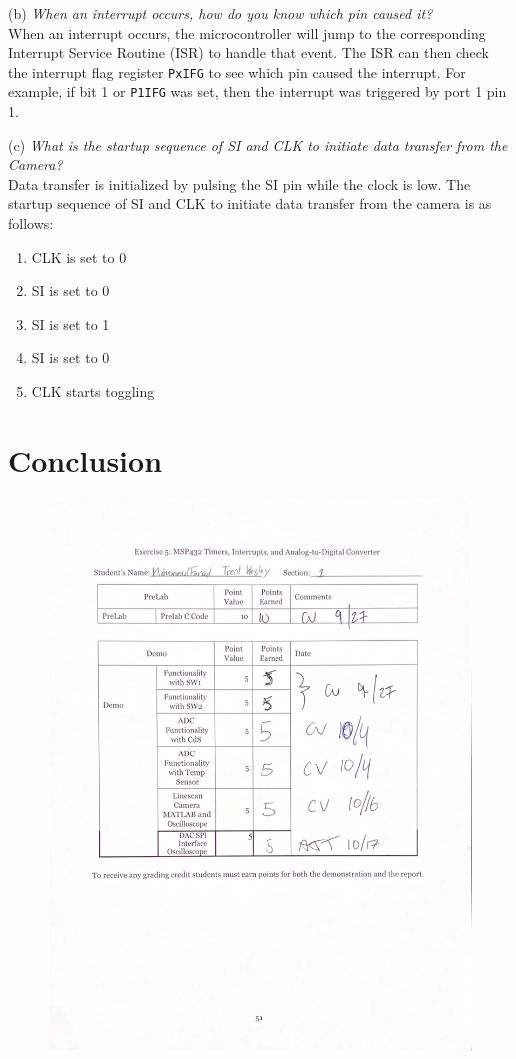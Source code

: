 \documentclass[CMPE]{KGCOEReport}
\begin{document}
(b) \emph{When an interrupt occurs, how do you know which pin caused it?}\\

When an interrupt occurs, the microcontroller will jump to the corresponding Interrupt Service Routine (ISR) to handle that event. The ISR can then check the interrupt flag register \verb|PxIFG| to see which pin caused the interrupt. For example, if bit 1 or \verb|P1IFG| was set, then the interrupt was triggered by port 1 pin 1.
\bigskip

(c) \emph{What is the startup sequence of SI and CLK to initiate data transfer from the Camera?}\\

Data transfer is initialized by pulsing the SI pin while the clock is low. The startup sequence of SI and CLK to initiate data transfer from the camera is as follows:

\begin{enumerate}
    \item CLK is set to 0
    \item SI is set to 0
    \item SI is set to 1
    \item SI is set to 0
    \item CLK starts toggling
\end{enumerate}

\section*{Conclusion}

\newpage
\begin{figure}[H]
    \centering
    \begin{adjustbox}{center}
        \includegraphics[width=1.26\textwidth]{signoff.pdf}
    \end{adjustbox}
\end{figure}
\end{document}
